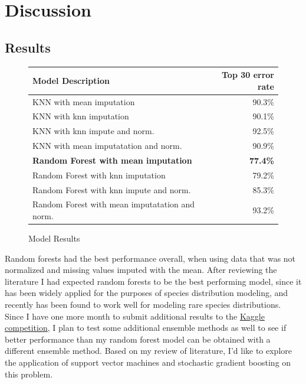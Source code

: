 \documentclass[12pt, oneside]{article}
\begin{document}
\section{Discussion}
\label{Discussion}

\begin{normalsize}

\subsection{Results}

\begin{figure}[H]
\caption{Model Results}
\centering
\footnotesize
\setlength{\tabcolsep}{0.5em} %
{\renewcommand{\arraystretch}{1.2}%
\begin{tabular}{ |l|r| }
\hline
Model Description & Top 30 error rate \\
\hline
 KNN with mean imputation & 90.3\% \\
 KNN with knn imputation & 90.1\% \\  
 KNN with knn impute and norm. & 92.5\% \\
 KNN with mean imputatation and norm. & 90.9\% \\
 \hline
\textbf{Random Forest with mean imputation} & \textbf{77.4\%} \\
 Random Forest with knn imputation & 79.2\% \\  
 Random Forest with knn impute and norm. & 85.3\% \\
 Random Forest with mean imputatation and norm. & 93.2\% \\
 \hline
\end{tabular}
}
\end{figure}

Random forests had the best performance overall, when using data that was not normalized and missing values imputed with the mean. After reviewing the literature I had expected random forests to be the best performing model, since it has been widely applied for the purposes of species distribution modeling, and recently has been found to work well for modeling rare species distributions. Since I have one more month to submit additional results to the \href{https://www.kaggle.com/c/geolifeclef-2022-lifeclef-2022-fgvc9/overview}{Kaggle competition}, I plan to test some additional ensemble methods as well to see if better performance than my random forest model can be obtained with a different ensemble method. Based on my review of literature, I'd like to explore the application of support vector machines and stochastic gradient boosting on this problem. 


\end{normalsize}
\end{document}
